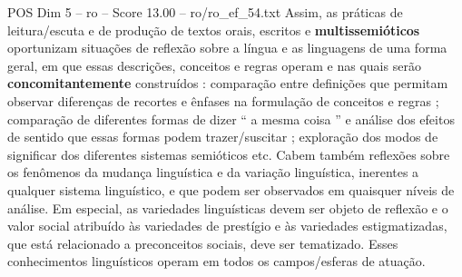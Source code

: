 \begin{textsample}{POS Dim 5 – ro – Score 13.00 – ro/ro\_ef\_54.txt}
Assim, as práticas de leitura/escuta e de produção de textos orais, escritos e \textbf{multissemióticos} oportunizam situações de reflexão sobre a língua e as linguagens de uma forma geral, em que essas descrições, conceitos e regras operam e nas quais serão \textbf{concomitantemente} construídos : comparação entre definições que permitam observar diferenças de recortes e ênfases na formulação de conceitos e regras ; comparação de diferentes formas de dizer “ a mesma coisa ” e análise dos efeitos de sentido que essas formas podem trazer/suscitar ; exploração dos modos de significar dos diferentes sistemas semióticos etc.
Cabem também reflexões sobre os fenômenos da mudança linguística e da variação linguística, inerentes a qualquer sistema linguístico, e que podem ser observados em quaisquer níveis de análise.
Em especial, as variedades linguísticas devem ser objeto de reflexão e o valor social atribuído às variedades de prestígio e às variedades estigmatizadas, que está relacionado a preconceitos sociais, deve ser tematizado.
Esses conhecimentos linguísticos operam em todos os campos/esferas de atuação.

\end{textsample}

